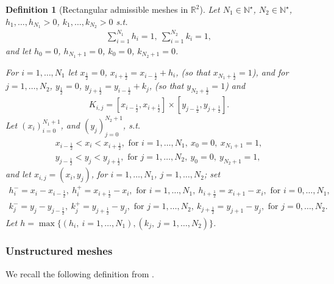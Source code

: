 \documentclass[oneside,11pt]{book}
\numberwithin{equation}{section}
\newtheorem{definition}{Definition}[section]
\begin{document}
\begin{definition}[Rectangular admissible meshes in $\mathbb{R}^2$]
    Let $N_1\in\mathbb{N}^\star$, $N_2\in\mathbb{N}^\star$, $h_1,\ldots,h_{N_1} > 0$, $k_1,\ldots,k_{N_2} > 0$ s.t.
    \begin{align*}
        \sum_{i=1}^{N_1} h_i = 1,\ \sum_{i=1}^{N_2} k_i = 1,
    \end{align*}
    and let $h_0 = 0$, $h_{N_1 + 1} = 0$, $k_0 = 0$, $k_{N_2 + 1} = 0$.
    
    For $i = 1,\ldots,N_1$ let $x_{\frac{1}{2}} = 0$, $x_{i+\frac{1}{2}} = x_{i-\frac{1}{2}} + h_i$, (so that $x_{N_1+\frac{1}{2}} = 1$), and for $j = 1,\ldots,N_2$, $y_{\frac{1}{2}} = 0$, $y_{j+\frac{1}{2}} = y_{i-\frac{1}{2}} + k_j$, (so that $y_{N_2+\frac{1}{2}} = 1$) and
    \begin{align*}
        K_{i,j} = [x_{i-\frac{1}{2}},x_{i+\frac{1}{2}}]\times[y_{j-\frac{1}{2}},y_{j+\frac{1}{2}}].
    \end{align*}
    Let $(x_i)_{i=0}^{N_1+1}$, and $(y_j)_{j=0}^{N_2+1}$, s.t.
    \begin{align*}
        x_{i-\frac{1}{2}} < x_i < x_{i+\frac{1}{2}},\mbox{ for } i = 1,\ldots,N_1,\ x_0 = 0,\ x_{N_1+1} = 1,\\
        y_{j-\frac{1}{2}} < y_j < y_{j+\frac{1}{2}},\mbox{ for } j = 1,\ldots,N_2,\ y_0 = 0,\ y_{N_2+1} = 1,
    \end{align*}
    and let $x_{i,j} = (x_i,y_j)$, for $i = 1,\ldots,N_1$, $j = 1,\ldots,N_2$; set
    \begin{align*}
        h_i^- = x_i - x_{i-\frac{1}{2}},\ h_i^+ = x_{i+\frac{1}{2}} - x_i,\mbox{ for } i = 1,\ldots,N_1,\ h_{i+\frac{1}{2}} = x_{i+1} - x_i,\mbox{ for } i = 0,\ldots,N_1,\\
        k_j^- = y_j - y_{j-\frac{1}{2}},\ k_j^+ = y_{j+\frac{1}{2}} - y_j,\mbox{ for } j = 1,\ldots,N_2,\ k_{j+\frac{1}{2}} = y_{j+1} - y_j,\mbox{ for } j = 0,\ldots,N_2.
    \end{align*}
    Let $h = \max\{(h_i,\ i = 1,\ldots,N_1),(k_j,\ j = 1,\ldots,N_2)\}$.
\end{definition}


\subsubsection{Unstructured meshes}
We recall the following definition from \cite[Definition 9.1, p. 37]{Eymard_Gallouet_Herbin2019}.
\end{document}
